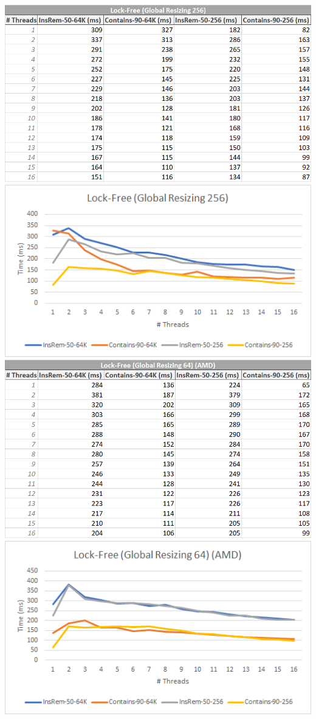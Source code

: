 \documentclass[11pt]{article} %
\begin{document}
\bigskip
\includegraphics[width=0.5\linewidth]{TableH.png}
\includegraphics[width=0.5\linewidth]{GraphH.png}
\bigskip
\includegraphics[width=0.5\linewidth]{TableI.png}
\includegraphics[width=0.5\linewidth]{GraphI.png}


\nocite{*}


\end{document}
